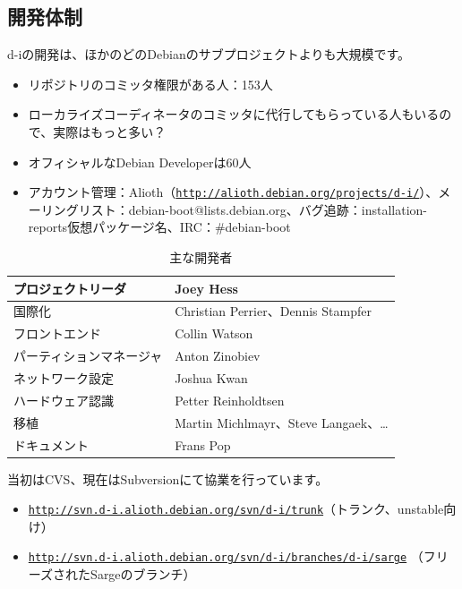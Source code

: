 \documentclass[mingoth]{jsarticle}
\begin{document}
\subsection{開発体制}
\label{sec:devel}

d-iの開発は、ほかのどのDebianのサブプロジェクトよりも大規模です。

\begin{itemize}
\item リポジトリのコミッタ権限がある人：153人
\item ローカライズコーディネータのコミッタに代行してもらっている人もいるので、実際はもっと多い？
\item オフィシャルなDebian Developerは60人
\item アカウント管理：Alioth（\texttt{\url{http://alioth.debian.org/projects/d-i/}}）、メーリングリスト：debian-boot@lists.debian.org、バグ追跡：installation-reports仮想パッケージ名、IRC：\#debian-boot
\end{itemize}

\begin{table}[htbp]
  \begin{tabular}[htbp]{|l|p{8cm}|}\hline
    プロジェクトリーダ&Joey Hess\\ \hline
    国際化&Christian Perrier、Dennis Stampfer\\ \hline
    フロントエンド&Collin Watson\\ \hline
    パーティションマネージャ&Anton Zinobiev\\ \hline
    ネットワーク設定&Joshua Kwan\\ \hline
    ハードウェア認識&Petter Reinholdtsen\\ \hline
    移植&Martin Michlmayr、Steve Langaek、…\\ \hline
    ドキュメント&Frans Pop\\ \hline
  \end{tabular}
  \caption{主な開発者}
  \label{tab:core}
\end{table}

当初はCVS、現在はSubversionにて協業を行っています。

\begin{itemize}
\item \texttt{\url{http://svn.d-i.alioth.debian.org/svn/d-i/trunk}}（トランク、unstable向け）
\item \texttt{\url{http://svn.d-i.alioth.debian.org/svn/d-i/branches/d-i/sarge}} （フリーズされたSargeのブランチ）
\end{itemize}
\end{document}
